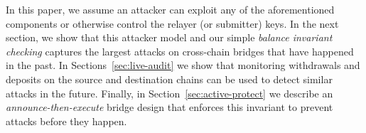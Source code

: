 





In this paper, we assume an attacker can exploit any of the aforementioned
components or otherwise control the relayer (or submitter) keys.
In the next section, we show that this attacker model and our simple
\emph{balance invariant checking} captures the largest attacks on cross-chain
bridges that have happened in the past.  In Sections~\ref{sec:live-audit} we show
that monitoring withdrawals and deposits on the source and destination chains
can be used to detect similar attacks in the future.  Finally, in
Section~\ref{sec:active-protect} we describe an \emph{announce-then-execute} bridge
design that enforces this invariant to prevent attacks before they happen.

